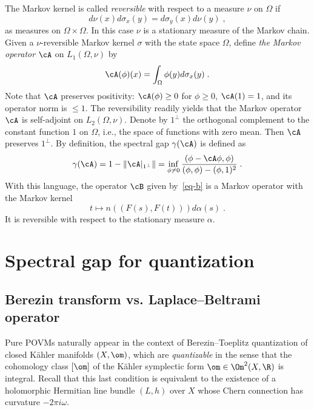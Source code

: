 The Markov kernel is called \emph{reversible} with respect to a measure $\nu$ on $\Omega$ if
\[
d\nu(x) d\sigma_x(y) = d\sigma_y(x) d\nu(y)\;,
\]
as measures on $\Omega \times \Omega$. In this case
$\nu$ is a stationary measure of the Markov chain. Given a $\nu$-reversible Markov kernel $\sigma$ with the state space $\Omega$, define \emph{the Markov operator} $\cA$ on $L_1(\Omega,\nu)$ by
\begin{equation}\label{eq-cP}
\cA(\phi)(x) = \int_\Omega \phi(y)d\sigma_x (y)\;.
\end{equation}
Note that $\cA$ preserves positivity: $\cA(\phi)\geq 0$ for $\phi \geq 0$, $\cA(1)=1$, and its operator norm is $\leq 1$. The reversibility readily yields that the Markov operator $\cA$ is self-adjoint on $L_2(\Omega, \nu)$. Denote by $1^\bot$ the orthogonal complement to the constant function $1$ on $\Omega$, i.e., the space of functions with zero mean. Then $\cA$ preserves $1^\bot$. By definition, the spectral gap $\gamma(\cA)$ is defined as
\begin{equation}\label{gap-Markov}
\gamma(\cA) = 1- \|\cA|_{1^\bot}\| = \inf_{\phi \neq 0} \frac{(\phi -\cA\phi,\phi)}{(\phi,\phi)-(\phi,1)^2}\;.
\end{equation}
With this language, the operator $\cB$ given by~\eqref{eq-b} is a Markov operator with the Markov kernel
\begin{equation}\label{eq-kernel}
t \mapsto n((F(s),F(t)))d\alpha(s)\;.
\end{equation}
It is reversible with respect to the stationary measure $\alpha$.



\section{Spectral gap for quantization}\label{subsec-BT}

\subsection{Berezin transform vs. Laplace--Beltrami operator}\label{subsec-BLB}
Pure POVMs naturally appear in the context of Berezin--Toeplitz quantization of closed K\"ahler manifolds $(X,\om)$, which are
\emph{quantizable} in the sense that the cohomology class $[\om]$ of the K\"ahler symplectic form $\om\in\Om^2(X,\R)$ is integral. Recall that this last condition is equivalent to the existence of a holomorphic Hermitian line bundle $(L,h)$ over $X$ whose Chern connection has curvature $-2\pi i\omega$.

